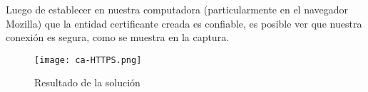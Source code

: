 Luego de establecer en nuestra computadora (particularmente en el navegador Mozilla) que la 
entidad certificante creada es confiable, es posible ver que nuestra conexión es segura, como 
se muestra en la captura.

\begin{center}
    \begin{figure}   
       \begin{center}
          \texttt{[image: ca-HTTPS.png]}
       \end{center}
       \caption{Resultado de la solución}
    \end{figure}
 \end{center}






